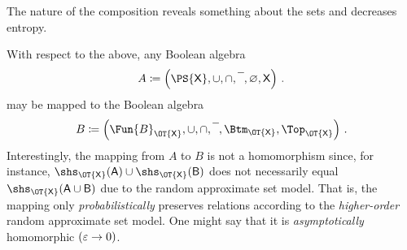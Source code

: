 \documentclass[ ../main.tex]{subfiles}
\begin{document}
The nature of the composition reveals something about the sets and decreases entropy.

With respect to the above, any Boolean algebra
\begin{equation}
A \coloneqq \left(\PS{\Set{X}}, \SetUnion, \SetIntersection, \SetComplement, \EmptySet, \Set{X}\right)\,.
\end{equation}
may be mapped to the Boolean algebra
\begin{equation}
B \coloneqq \left(\Fun{B}_{\OT{\Set{X}}}, \SetUnion, \SetIntersection, \SetComplement, \Btm_{\OT{\Set{X}}}, \Top_{\OT{\Set{X}}}\right)\,.
\end{equation}
Interestingly, the mapping from $A$ to $B$ is not a homomorphism since, for instance, $\shs_{\OT{\Set{X}}}(\Set{A}) \SetUnion \shs_{\OT{\Set{X}}}(\Set{B})$ does not necessarily equal $\shs_{\OT{\Set{X}}}(\Set{A} \SetUnion \Set{B})$ due to the random approximate set model.
That is, the mapping only \emph{probabilistically} preserves relations according to the \emph{higher-order} random approximate set model.
One might say that it is \emph{asymptotically} homomorphic $(\varepsilon \to 0)$.
\end{document}
